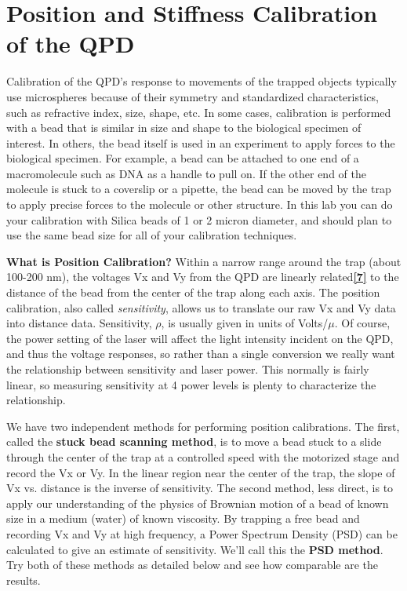 \documentclass{../lab}
\begin{document}
\section{Position and Stiffness Calibration of the QPD}

Calibration of the QPD's response to movements of the trapped objects typically use microspheres because of their symmetry and standardized characteristics, such as refractive index, size, shape, etc. In some cases, calibration is performed with a bead that is similar in size and shape to the biological specimen of interest. In others, the bead itself is used in an experiment to apply forces to the biological specimen. For example, a bead can be attached to one end of a macromolecule such as DNA as a handle to pull on. If the other end of the molecule is stuck to a coverslip or a pipette, the bead can be moved by the trap to apply precise forces to the molecule or other structure. In this lab you can do your calibration with Silica beads of 1 or 2 micron diameter, and should plan to use the same bead size for all of your calibration techniques.

\textbf{What is Position Calibration?} Within a narrow range around the trap (about 100-200 nm), the voltages Vx and Vy from the QPD are linearly related\href{http://www.opticsinfobase.org/ol/abstract.cfm?uri=ol-23-1-7}{\textbf{[7]}} to the distance of the bead from the center of the trap along each axis. The position calibration, also called \emph{sensitivity}, allows us to translate our raw Vx and Vy data into distance data. Sensitivity, $ \rho $, is usually given in units of Volts/$ \mu $. Of course, the power setting of the laser will affect the light intensity incident on the QPD, and thus the voltage responses, so rather than a single conversion we really want the relationship between sensitivity and laser power. This normally is fairly linear, so measuring sensitivity at 4 power levels is plenty to characterize the relationship.

We have two independent methods for performing position calibrations. The first, called the \textbf{stuck bead scanning method}, is to move a bead stuck to a slide through the center of the trap at a controlled speed with the motorized stage and record the Vx or Vy. In the linear region near the center of the trap, the slope of Vx vs. distance is the inverse of sensitivity. The second method, less direct, is to apply our understanding of the physics of Brownian motion of a bead of known size in a medium (water) of known viscosity. By trapping a free bead and recording Vx and Vy at high frequency, a Power Spectrum Density (PSD) can be calculated to give an estimate of sensitivity. We'll call this the \textbf{PSD method}. Try both of these methods as detailed below and see how comparable are the results.
\end{document}
